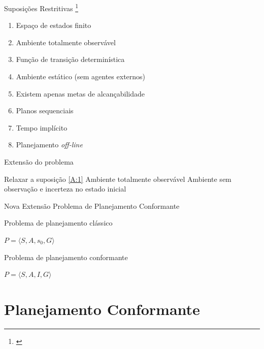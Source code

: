 \begin{frame}{Suposições Restritivas \footnote{\cite{Ghallab:2004}}}
    \begin{enumerate}
        \item Espaço de estados finito 
        \item Ambiente totalmente observável \label{A:1}
        \item Função de transição determinística 
        \item Ambiente estático (sem agentes externos)
        \item Existem apenas metas de alcançabilidade 
        \item Planos sequenciais
        \item Tempo implícito
        \item Planejamento \textit{off-line}
    \end{enumerate}
    
\end{frame}

\begin{frame}{Extensão do problema}
    \begin{block}{Relaxar a suposição \ref{A:1} Ambiente totalmente observável}
        Ambiente sem observação e incerteza no estado inicial
    \end{block}
    
    \begin{block}{Nova Extensão}
        Problema de Planejamento Conformante
    \end{block}
    \pause
    \begin{block}{Problema de planejamento clássico}
        \begin{center}
            $P = \langle S, A, s_0, G \rangle$
        \end{center}
    \end{block}
    
    \begin{block}{Problema de planejamento conformante}
        \begin{center}
            $P = \langle S, A, I, G \rangle$
        \end{center}
    \end{block}
\end{frame}




\section{Planejamento Conformante}


